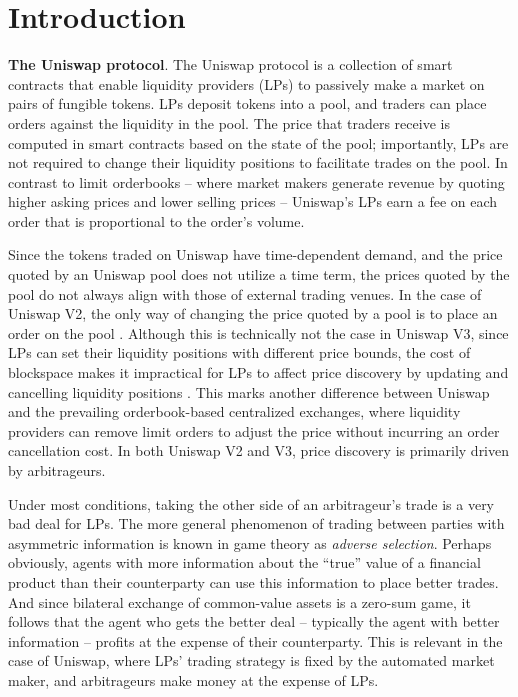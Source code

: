 \section{Introduction} \label{section:intro}

    \textbf{The Uniswap protocol}.
        The Uniswap protocol is a collection of smart contracts that enable liquidity providers (LPs) to passively make a market on pairs of fungible tokens. LPs deposit tokens into a pool, and traders can place orders against the liquidity in the pool. The price that traders receive is computed in smart contracts based on the state of the pool; importantly, LPs are not required to change their liquidity positions to facilitate trades on the pool. In contrast to limit orderbooks -- where market makers generate revenue by quoting higher asking prices and lower selling prices -- Uniswap's LPs earn a fee on each order that is proportional to the order's volume.

        Since the tokens traded on Uniswap have time-dependent demand, and the price quoted by an Uniswap pool does not utilize a time term, the prices quoted by the pool do not always align with those of external trading venues. In the case of Uniswap V2, the only way of changing the price quoted by a pool is to place an order on the pool \cite{v2Core}. Although this is technically not the case in Uniswap V3, since LPs can set their liquidity positions with different price bounds, the cost of blockspace makes it impractical for LPs to affect price discovery by updating and cancelling liquidity positions \cite{v3Core}. This marks another difference between Uniswap and the prevailing orderbook-based centralized exchanges, where liquidity providers can remove limit orders to adjust the price without incurring an order cancellation cost. In both Uniswap V2 and V3, price discovery is primarily driven by arbitrageurs.

        Under most conditions, taking the other side of an arbitrageur's trade is a very bad deal for LPs. The more general phenomenon of trading between parties with asymmetric information is known in game theory as \textit{adverse selection}. %
        Perhaps obviously, agents with more information about the ``true'' value of a financial product than their counterparty can use this information to place better trades. 
        And since bilateral exchange of common-value assets is a zero-sum game, %
        it follows that the agent who gets the better deal -- typically the agent with better information -- profits at the expense of their counterparty. This is relevant in the case of Uniswap, where LPs' trading strategy is fixed by the automated market maker, and arbitrageurs make money at the expense of LPs. %
        
